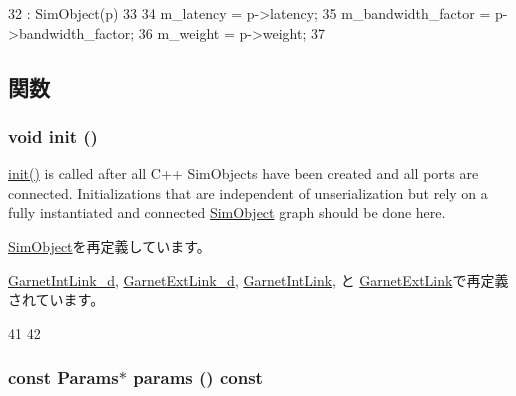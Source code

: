 \begin{DoxyCode}
32     : SimObject(p)
33 {
34     m_latency = p->latency;
35     m_bandwidth_factor = p->bandwidth_factor;
36     m_weight = p->weight;
37 }
\end{DoxyCode}


\subsection{関数}
\hypertarget{classBasicLink_a02fd73d861ef2e4aabb38c0c9ff82947}{
\subsubsection[{init}]{\setlength{\rightskip}{0pt plus 5cm}void init ()}}
\label{classBasicLink_a02fd73d861ef2e4aabb38c0c9ff82947}
\hyperlink{classBasicLink_a02fd73d861ef2e4aabb38c0c9ff82947}{init()} is called after all C++ SimObjects have been created and all ports are connected. Initializations that are independent of unserialization but rely on a fully instantiated and connected \hyperlink{classSimObject}{SimObject} graph should be done here. 

\hyperlink{classSimObject_a02fd73d861ef2e4aabb38c0c9ff82947}{SimObject}を再定義しています。

\hyperlink{classGarnetIntLink__d_a02fd73d861ef2e4aabb38c0c9ff82947}{GarnetIntLink\_\-d}, \hyperlink{classGarnetExtLink__d_a02fd73d861ef2e4aabb38c0c9ff82947}{GarnetExtLink\_\-d}, \hyperlink{classGarnetIntLink_a02fd73d861ef2e4aabb38c0c9ff82947}{GarnetIntLink}, と \hyperlink{classGarnetExtLink_a02fd73d861ef2e4aabb38c0c9ff82947}{GarnetExtLink}で再定義されています。


\begin{DoxyCode}
41 {
42 }
\end{DoxyCode}
\hypertarget{classBasicLink_acd3c3feb78ae7a8f88fe0f110a718dff}{
\subsubsection[{params}]{\setlength{\rightskip}{0pt plus 5cm}const {\bf Params}$\ast$ params () const}}
\label{classBasicLink_acd3c3feb78ae7a8f88fe0f110a718dff}


